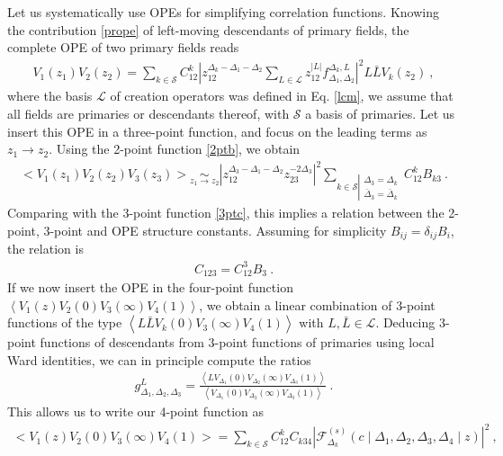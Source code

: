 \documentclass[12pt, a4paper]{article}
\theoremstyle{break}
\begin{document}
Let us systematically use OPEs for simplifying correlation functions. Knowing the contribution \eqref{prope} of left-moving descendants of primary fields, the complete OPE of two primary fields reads 
\begin{align}
 V_1(z_1)V_2(z_2) = \sum_{k\in\mathcal{S}} C_{12}^k \left|z_{12}^{\Delta_k-\Delta_1-\Delta_2}\sum_{L\in\mathcal{L}} z_{12}^{|L|}f_{\Delta_1,\Delta_2}^{\Delta_k,L}\right|^2 L\bar L V_k(z_2)\ ,
 \label{tope}
\end{align}
where the basis $\mathcal{L}$ of creation operators was defined in Eq. \eqref{lcm},
we assume that all fields are primaries or descendants thereof, with $\mathcal{S}$ a basis of primaries. Let us insert this OPE in a three-point function, and focus on the leading terms as $z_1\to z_2$. Using the 2-point function \eqref{2ptb}, we obtain
\begin{align}
  \Big< V_1(z_1)V_2(z_2)V_3(z_3) \Big> \underset{z_1\to z_2}{\sim} 
  \left|z_{12}^{\Delta_3-\Delta_1-\Delta_2}z_{23}^{-2\Delta_3}\right|^2 
  \sum_{k\in\mathcal{S}\left|\substack{\Delta_3=\Delta_k\\ \bar{\Delta}_3=\bar\Delta_k}\right. }
  C_{12}^k B_{k3}\ .
\end{align}
Comparing with the 3-point function \eqref{3ptc}, this implies a relation between the 2-point, 3-point and OPE structure constants. Assuming for simplicity $B_{ij}=\delta_{ij}B_i$, the relation is 
\begin{align}
 \boxed{C_{123} = C_{12}^3B_{3}} \ .
 \label{ccb}
\end{align}
If we now insert the OPE in the four-point function $\left<V_1(z)V_2(0)V_3(\infty)V_4(1)\right>$, we obtain a linear combination of 3-point functions of the type $\left<L\bar{L}V_k(0) V_3(\infty)V_4(1)\right>$ with $L,\bar L\in\mathcal{L}$. Deducing 3-point functions of descendants from 3-point functions of primaries using local Ward identities, we can in principle compute the ratios
\begin{align}
 g^L_{\Delta_1,\Delta_2,\Delta_3} = \frac{\left< LV_{\Delta_1}(0) V_{\Delta_2}(\infty)V_{\Delta_3}(1)\right>}{\left< V_{\Delta_1}(0) V_{\Delta_2}(\infty)V_{\Delta_3}(1)\right>}\ .
\end{align}
This allows us to write our 4-point function as 
\begin{align}
 \boxed{\Big<V_1(z)V_2(0)V_3(\infty)V_4(1)\Big> = \sum_{k\in\mathcal{S}} C_{12}^k C_{k34} \left|\mathcal{F}^{(s)}_{\Delta_k}\left(c\middle|\Delta_1,\Delta_2,\Delta_3,\Delta_4\middle|z\right)\right|^2}  \ ,
 \label{sdec}
\end{align}
\end{document}
